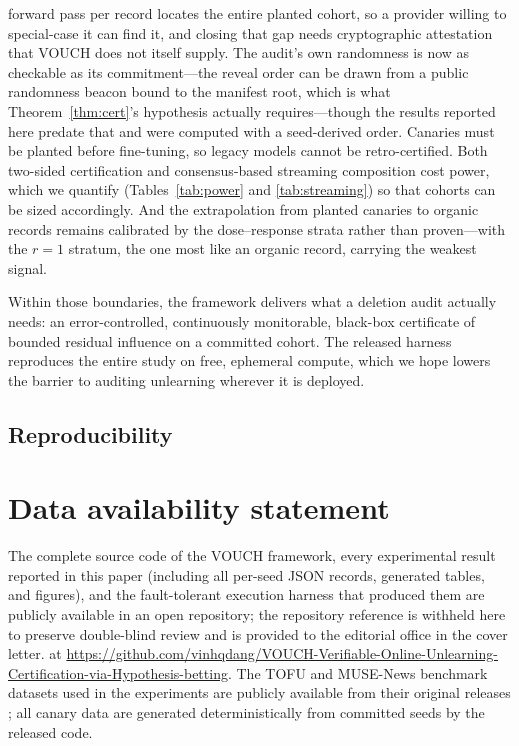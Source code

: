 \documentclass[pdflatex,sn-mathphys-num]{sn-jnl}
\theoremstyle{thmstyleone}
\theoremstyle{thmstyletwo}
\theoremstyle{thmstylethree}
\begin{document}
forward pass per record locates the entire planted cohort, so a provider willing to
special-case it can find it, and closing that gap needs cryptographic attestation that
VOUCH does not itself supply. The audit's own randomness is now as checkable as its
commitment---the reveal order can be drawn from a public randomness beacon bound to the
manifest root, which is what Theorem~\ref{thm:cert}'s hypothesis actually
requires---though the results reported here predate that and were computed with a
seed-derived order. Canaries must be planted before fine-tuning, so legacy
models cannot be retro-certified. Both two-sided certification and consensus-based
streaming composition cost power, which we quantify (Tables~\ref{tab:power} and
\ref{tab:streaming}) so that cohorts can be sized accordingly. And the extrapolation
from planted canaries to organic records remains calibrated by the dose--response
strata rather than proven---with the $r = 1$ stratum, the one most like an organic
record, carrying the weakest signal.

Within those boundaries, the framework delivers what a deletion audit actually needs:
an error-controlled, continuously monitorable, black-box certificate of bounded
residual influence on a committed cohort. The released harness reproduces the entire
study on free, ephemeral compute, which we hope lowers the barrier to auditing
unlearning wherever it is deployed.

\backmatter

\begin{appendices}
\section{Reproducibility}\label{app:repro}

\end{appendices}

\section*{Data availability statement}

The complete source code of the VOUCH framework, every experimental result reported
in this paper (including all per-seed JSON records, generated tables, and figures),
and the fault-tolerant execution harness that produced them are publicly available
\ifanon
in an open repository; the repository reference is withheld here to preserve
double-blind review and is provided to the editorial office in the cover letter.
\else
at \url{https://github.com/vinhqdang/VOUCH-Verifiable-Online-Unlearning-Certification-via-Hypothesis-betting}.
\fi
The TOFU and MUSE-News benchmark datasets used in the experiments are publicly
available from their original releases \citep{maini2024tofu,shi2024muse}; all
canary data are generated deterministically from committed seeds by the released
code.


\end{document}
